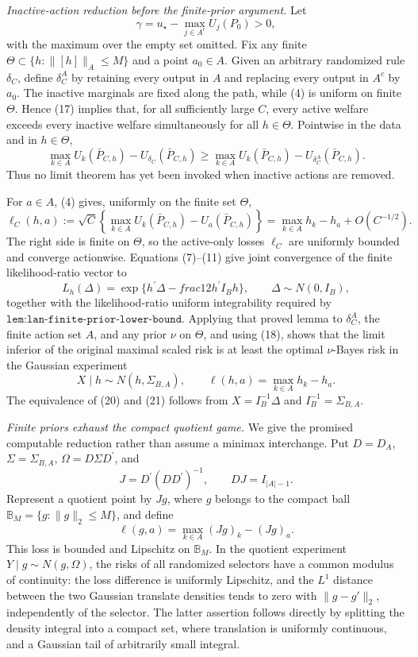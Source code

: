 \emph{Inactive-action reduction before the finite-prior argument.}
Let
\[
 \gamma=u_\star-\max_{j\in A^c}U_j(P_0)>0,                         \tag{17}
\]
with the maximum over the empty set omitted.  Fix any finite \(\Theta\subset\{h:\lVert[h]\rVert_A\leq M\}\) and a point \(a_0\in A\).  Given an arbitrary randomized rule \(\delta_C\), define \(\delta_C^A\) by retaining every output in \(A\) and replacing every output in \(A^c\) by \(a_0\).  The inactive marginals are fixed along the path, while (4) is uniform on finite \(\Theta\).  Hence (17) implies that, for all sufficiently large \(C\), every active welfare exceeds every inactive welfare simultaneously for all \(h\in\Theta\).  Pointwise in the data and in \(h\in\Theta\),
\[
 \max_{k\in A}U_k(\bar P_{C,h})-U_{\delta_C}(\bar P_{C,h})
 \geq
 \max_{k\in A}U_k(\bar P_{C,h})-U_{\delta_C^A}(\bar P_{C,h}).     \tag{18}
\]
Thus no limit theorem has yet been invoked when inactive actions are removed.

For \(a\in A\), (4) gives, uniformly on the finite set \(\Theta\),
\[
 \ell_C(h,a):=\sqrt C\left\{\max_{k\in A}U_k(\bar P_{C,h})
                       -U_a(\bar P_{C,h})\right\}
 =\max_{k\in A}h_k-h_a+O(C^{-1/2}).                               \tag{19}
\]
The right side is finite on \(\Theta\), so the active-only losses \(\ell_C\) are uniformly bounded and converge actionwise.  Equations (7)--(11) give joint convergence of the finite likelihood-ratio vector to
\[
 L_h(\Delta)=\exp\{h^{\prime}\Delta-  frac12h^{\prime}I_Bh\},
 \qquad \Delta\sim N(0,I_B),                                     \tag{20}
\]
together with the likelihood-ratio uniform integrability required by \(\texttt{lem:lan-finite-prior-lower-bound}\).  Applying that proved lemma to \(\delta_C^A\), the finite action set \(A\), and any prior \(\nu\) on \(\Theta\), and using (18), shows that the limit inferior of the original maximal scaled risk is at least the optimal \(\nu\)-Bayes risk in the Gaussian experiment
\[
 X\mid h\sim N(h,\Sigma_{B,A}),
 \qquad \ell(h,a)=\max_{k\in A}h_k-h_a.                           \tag{21}
\]
The equivalence of (20) and (21) follows from \(X=I_B^{-1}\Delta\) and \(I_B^{-1}=\Sigma_{B,A}\).

\emph{Finite priors exhaust the compact quotient game.}
We give the promised computable reduction rather than assume a minimax interchange.  Put \(D=D_A\), \(\Sigma=\Sigma_{B,A}\), \(\Omega=D\Sigma D^{\prime}\), and
\[
 J=D^{\prime}(DD^{\prime})^{-1},\qquad DJ=I_{|A|-1}.               \tag{22}
\]
Represent a quotient point by \(Jg\), where \(g\) belongs to the compact ball \(\mathbb B_M=\{g:\lVert g\rVert_2\leq M\}\), and define
\[
 \ell(g,a)=\max_{k\in A}(Jg)_k-(Jg)_a.
\]
This loss is bounded and Lipschitz on \(\mathbb B_M\).  In the quotient experiment \(Y\mid g\sim N(g,\Omega)\), the risks of all randomized selectors have a common modulus of continuity: the loss difference is uniformly Lipschitz, and the \(L^1\) distance between the two Gaussian translate densities tends to zero with \(\lVert g-g'\rVert_2\), independently of the selector.  The latter assertion follows directly by splitting the density integral into a compact set, where translation is uniformly continuous, and a Gaussian tail of arbitrarily small integral.


